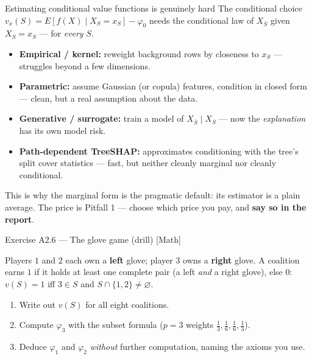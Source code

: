 \documentclass[aspectratio=169,11pt]{beamer}
\begin{document}
\begin{frame}{Estimating conditional value functions is genuinely hard}
  \footnotesize
  The conditional choice $v_x(S)=E[f(X)\mid X_S=x_S]-\varphi_0$ needs the
  conditional law of $X_{\bar S}$ given $X_S = x_S$ --- for \emph{every} $S$.
  \begin{readme}
    \begin{itemize}
      \item \textbf{Empirical / kernel:} reweight background rows by closeness to
            $x_S$ --- struggles beyond a few dimensions.
      \item \textbf{Parametric:} assume Gaussian (or copula) features, condition in
            closed form --- clean, but a real assumption about the data.
      \item \textbf{Generative / surrogate:} train a model of $X_{\bar S}\mid X_S$
            --- now the \emph{explanation} has its own model risk.
      \item \textbf{Path-dependent TreeSHAP:} approximates conditioning with the
            tree's split cover statistics --- fast, but neither cleanly marginal nor
            cleanly conditional.
    \end{itemize}
  \end{readme}
  \begin{takeaway}
    This is why the marginal form is the pragmatic default: its estimator is a plain
    average. The price is Pitfall 1 --- choose which price you pay, and \textbf{say
    so in the report}.
  \end{takeaway}
\end{frame}

\begin{frame}{Exercise A2.6 --- The glove game (drill) [Math]}
\begin{exercise}
  Players $1$ and $2$ each own a \textbf{left} glove; player $3$ owns a
  \textbf{right} glove. A coalition earns $1$ if it holds at least one complete
  pair (a left \emph{and} a right glove), else $0$:
  $v(S)=1$ iff $3\in S$ and $S\cap\{1,2\}\neq\varnothing$.
  \begin{enumerate}
    \item Write out $v(S)$ for all eight coalitions.
    \item Compute $\varphi_3$ with the subset formula ($p=3$ weights
          $\tfrac13,\tfrac16,\tfrac16,\tfrac13$).
    \item Deduce $\varphi_1$ and $\varphi_2$ \emph{without} further computation,
          naming the axioms you use.
  \end{enumerate}
\end{exercise}
\end{frame}
\end{document}
